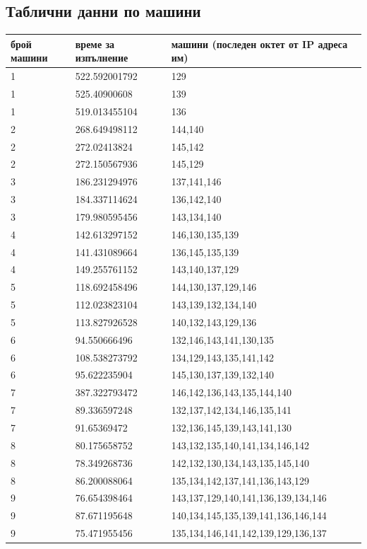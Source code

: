\documentclass[12pt]{extarticle}
\begin{document}
\subsection{Таблични данни по машини}
\scriptsize
\begin{center}
\begin{tabular}{ | l l l | }
\hline
брой машини & време за изпълнение & машини (последен октет от IP адреса им) \\
\hline
1 & 522.592001792 & 129 \\
1 & 525.40900608 & 139 \\
1 & 519.013455104 & 136 \\
2 & 268.649498112 & 144,140 \\
2 & 272.02413824 & 145,142 \\
2 & 272.150567936 & 145,129 \\
3 & 186.231294976 & 137,141,146 \\
3 & 184.337114624 & 136,142,140 \\
3 & 179.980595456 & 143,134,140 \\
4 & 142.613297152 & 146,130,135,139 \\
4 & 141.431089664 & 136,145,135,139 \\
4 & 149.255761152 & 143,140,137,129 \\
5 & 118.692458496 & 144,130,137,129,146 \\
5 & 112.023823104 & 143,139,132,134,140 \\
5 & 113.827926528 & 140,132,143,129,136 \\
6 & 94.550666496 & 132,146,143,141,130,135 \\
6 & 108.538273792 & 134,129,143,135,141,142 \\
6 & 95.622235904 & 145,130,137,139,132,140 \\
7 & 387.322793472 & 146,142,136,143,135,144,140 \\
7 & 89.336597248 & 132,137,142,134,146,135,141 \\
7 & 91.65369472 & 132,136,145,139,143,141,130 \\
8 & 80.175658752 & 143,132,135,140,141,134,146,142 \\
8 & 78.349268736 & 142,132,130,134,143,135,145,140 \\
8 & 86.200088064 & 135,134,142,137,141,136,143,129 \\
9 & 76.654398464 & 143,137,129,140,141,136,139,134,146 \\
9 & 87.671195648 & 140,134,145,135,139,141,136,146,144 \\
9 & 75.471955456 & 135,134,146,141,142,139,129,136,137 \\

\end{tabular}
\end{center}
\end{document}
